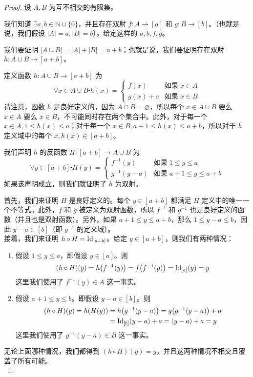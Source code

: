 \begin{proof}
    设 $A,B$ 为互不相交的有限集。

    我们知道 $\exists a, b \in \mathbb{N} \cup \{0\}$，并且存在双射 $f : A \to [a]$ 和 $g : B \to [b]$。（也就是说，我们假设 $|A| = a, |B| = b$）。给定这样的 $a, b, f, g$。

    我们要证明 $|A \cup B| = |A| + |B| = a + b$；也就是说，我们要证明存在双射 $h : A \cup B \to [a + b]$。

    定义函数 $h : A \cup B \to [a + b]$ 为
    \[\forall x \in A \cup B \centerdot h(x) = \begin{cases}
        f(x) & \text{如果}\; x \in A \\
        g(x)+a & \text{如果}\; x \in B
    \end{cases}\]
    请注意，函数 $h$ 是良好定义的，因为 $A \cap B = \varnothing$，所以每个 $x \in A \cup B$ 要么 $x \in A$ 要么 $x \in B$，不可能同时存在两个集合中。此外，对于每一个 $x \in A, 1 \le h(x) \le a$；对于每一个 $x \in B, a+1 \le h(x) \le a+b$，所以对于 $h$ 定义域中的每个 $x, h(x) \in [a+b]$。

    我们声明 $h$ 的反函数 $H : [a + b] \to A \cup B$ 为
    \[\forall y \in [a + b] \centerdot H(y) = \begin{cases}
        f^{-1}(y) & \text{如果}\; 1 \le y \le a \\
        g^{-1}(y-a) & \text{如果}\; a+1 \le y \le a+b
    \end{cases}\]
    如果该声明成立，则我们就证明了 $h$ 为双射。

    首先，我们来证明 $H$ 是良好定义的。每个 $y \in [a + b]$ 都满足 $H$ 定义中的唯一一个不等式。此外，$f$ 和 $g$ 被定义为双射函数，所以 $f^{-1}$ 和 $g^{-1}$ 也是良好定义的函数（并且也是双射函数）。另外，如果 $a + 1 \le y \le a + b$，那么 $1 \le y - a \le b$，因此 $y - a \in [b]$（即 $g^{-1}$ 的定义域）。\\

    接着，我们来证明 $h \circ H = \text{Id}_{[a+b]}$。给定 $y \in [a+b]$，则我们有两种情况：
    \begin{enumerate}[label=(\arabic*)]
        \item 假设 $1 \le y \le a$，即假设 $y \in [a]$。则
            \[(h \circ H)(y) = h\big(f^{-1}(y)\big) = f\big(f^{-1}(y)\big)= \text{Id}_{[a]}(y) = y\]
            这里我们使用了 $f^{-1}(y) \in A$ 这一事实。
        \item 假设 $a + 1 \le y \le b$。即假设 $y-a \in [b]$。则
            \begin{align*}
                (h \circ H)(y) = h(H(y)) &= h\big(g^{-1}(y-a)\big) = g\big(g^{-1}(y-a)\big)+a \\
                &= \text{Id}_{[b]}(y - a) + a = (y - a) + a = y
            \end{align*}
            这里我们使用了 $g^{-1}(y - a) \in B$ 这一事实。
    \end{enumerate}
    无论上面哪种情况，我们都得到 $(h \circ H)(y) = y$，并且这两种情况不相交且覆盖了所有可能。\\


\end{proof}

